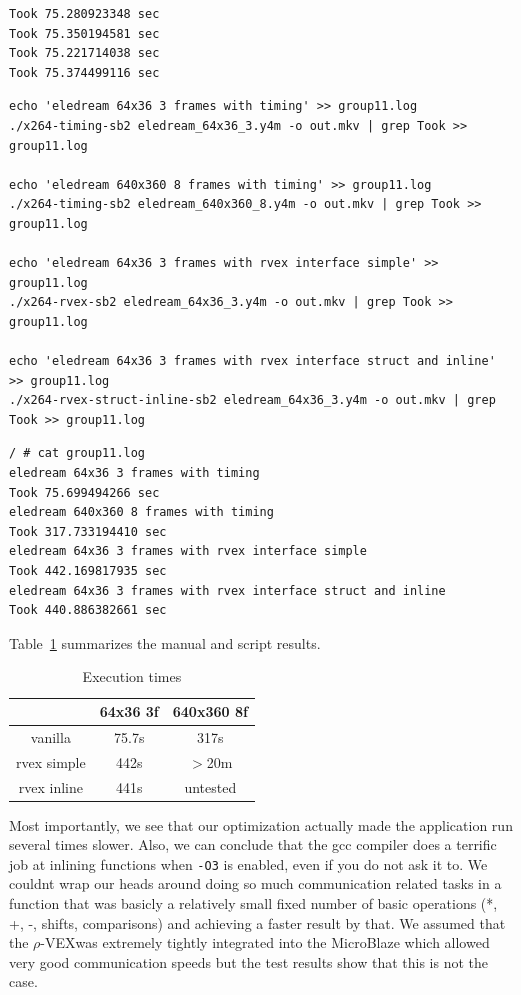 \documentclass{article}
\newcommand{\rvex}{\ensuremath{\rho}-VEX}
\begin{document}
\begin{verbatim}
Took 75.280923348 sec
Took 75.350194581 sec
Took 75.221714038 sec
Took 75.374499116 sec
\end{verbatim}

\begin{lstlisting}[style=bash,caption=Test script,label=lst:testscript]
echo 'eledream 64x36 3 frames with timing' >> group11.log
./x264-timing-sb2 eledream_64x36_3.y4m -o out.mkv | grep Took >> group11.log

echo 'eledream 640x360 8 frames with timing' >> group11.log
./x264-timing-sb2 eledream_640x360_8.y4m -o out.mkv | grep Took >> group11.log

echo 'eledream 64x36 3 frames with rvex interface simple' >> group11.log
./x264-rvex-sb2 eledream_64x36_3.y4m -o out.mkv | grep Took >> group11.log

echo 'eledream 64x36 3 frames with rvex interface struct and inline' >> group11.log
./x264-rvex-struct-inline-sb2 eledream_64x36_3.y4m -o out.mkv | grep Took >> group11.log
\end{lstlisting}

\begin{lstlisting}[style=bash,caption=Test output,label=lst:testoutput]
/ # cat group11.log
eledream 64x36 3 frames with timing
Took 75.699494266 sec
eledream 640x360 8 frames with timing
Took 317.733194410 sec
eledream 64x36 3 frames with rvex interface simple
Took 442.169817935 sec
eledream 64x36 3 frames with rvex interface struct and inline
Took 440.886382661 sec
\end{lstlisting}

Table~\ref{tab:exe-times} summarizes the manual and script results.

\begin{table}[!h]
    \centering
    \caption{Execution times}
    \label{tab:exe-times}
    \begin{tabular}{|c|c|c|}
       \hline
                   & 64x36 3f & 640x360 8f \\ \hline
       vanilla     & 75.7s    & 317s       \\
       rvex simple & 442s     & $>$20m     \\
       rvex inline & 441s     & untested   \\
       \hline
    \end{tabular}
\end{table}

Most importantly, we see that our optimization actually made the application
run several times slower.  Also, we can conclude that the gcc compiler does a
terrific job at inlining functions when \texttt{-O3} is enabled, even if you do
not ask it to.  We couldnt wrap our heads around doing so much communication
related tasks in a function that was basicly a relatively small fixed number of
basic operations (*, +, -, shifts, comparisons) and achieving a faster result
by that.  We assumed that the \rvex was extremely tightly integrated into the
MicroBlaze which allowed very good communication speeds but the test results
show that this is not the case.
\end{document}
